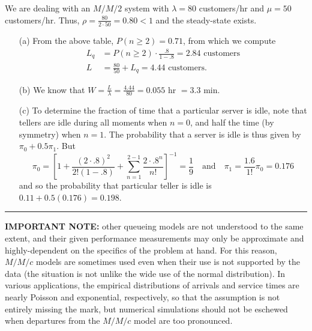 We are dealing with an $M/M/2$ system with $\lambda =80 $ customers/hr and $\mu = 50$ customers/hr. Thus, $\rho = \frac{80}{2\cdot 50} = 0.80 < 1$ and the steady-state exists. 
\begin{itemize}[noitemsep]
	\item[(a)]  From the above table, $P(n \geq 2) = 0.71$, from which we compute 
\begin{align*} L_{q} &= P( n \geq 2)\cdot \frac{.8}{1-.8} = 2.84 \text{ customers}\\
L& = 	\frac{80}{50} + L_{q}	= 4.44 \text{ customers.} \end{align*}
\item[(b)]	We know that $W = \frac{L}{\lambda} = \frac{4.44}{80} = 0.055 \text{ hr }= 3.3 $ min.
\item[(c)] To determine the fraction of time that a particular server is idle, note that tellers are idle during all moments when $n=0 $, and half the time (by symmetry) when $n = 1$. The probability that a server is idle is thus given by $ \pi_{0} + 0.5 \pi_{1}$. But
 $$\pi_{0} = \left[1 + \frac{\left(2\cdot .8\right)^{2}}{2! \left(1-.8\right)} + \sum^{2-1}_{n=1} \frac{2\cdot .8^{n}}{n!}\right]^{-1}= \frac{1}{9} \quad\mbox{and}\quad \pi_{1} = \frac{1.6}{1!} \pi_{0} = 0.176$$ and so the probability that particular teller is idle is $0.11 + 0.5(0.176) = 0.198$.
\end{itemize}
\begin{center}
    \rule{0.5\textwidth}{.4pt}
\end{center}
\textbf{IMPORTANT NOTE:} other queueing models are not understood to the same extent, and their given performance measurements may only be approximate and highly-dependent on the specifics of the problem at hand. For this reason, $M/M/c$ models are sometimes used even when their use is not supported by the data (the situation is not unlike the wide use of the normal distribution). In various applications, the empirical distributions of arrivals and service times are nearly Poisson and exponential, respectively, so that the assumption is not entirely missing the mark, but numerical simulations should not be eschewed when departures from the $M/M/c$ model are too pronounced.
